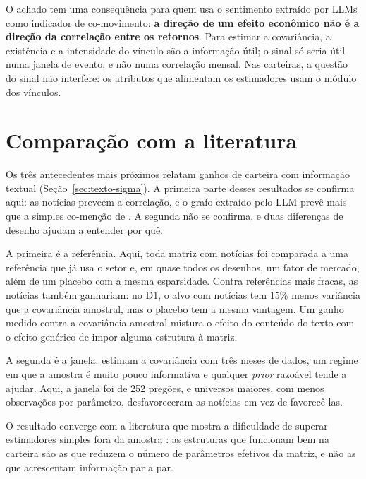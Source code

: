 O achado tem uma consequência para quem usa o sentimento extraído por LLMs como indicador de co-movimento:
\textbf{a direção de um efeito econômico não é a direção da correlação entre os retornos}. Para estimar a
covariância, a existência e a intensidade do vínculo são a informação útil; o sinal só seria útil numa
janela de evento, e não numa correlação mensal. Nas carteiras, a questão do sinal não interfere: os
atributos que alimentam os estimadores usam o módulo dos vínculos.

\section{Comparação com a literatura}
\label{sec:comparacao}

Os três antecedentes mais próximos relatam ganhos de carteira com informação textual
(Seção~\ref{sec:texto-sigma}). A primeira parte desses resultados se confirma aqui: as notícias preveem a
correlação, e o grafo extraído pelo LLM prevê mais que a simples co-menção de \citet{tang2019}. A segunda
não se confirma, e duas diferenças de desenho ajudam a entender por quê.

A primeira é a referência. Aqui, toda matriz com notícias foi comparada a uma referência que já usa o
setor e, em quase todos os desenhos, um fator de mercado, além de um placebo com a mesma esparsidade.
Contra referências mais fracas, as notícias também ganhariam: no D1, o alvo com notícias tem 15\% menos
variância que a covariância amostral, mas o placebo tem a mesma vantagem. Um ganho medido contra a
covariância amostral mistura o efeito do conteúdo do texto com o efeito genérico de impor alguma estrutura
à matriz.

A segunda é a janela. \citet{becquin2023} estimam a covariância com três meses de dados, um regime em que
a amostra é muito pouco informativa e qualquer \emph{prior} razoável tende a ajudar. Aqui, a janela foi
de 252 pregões, e universos maiores, com menos observações por parâmetro, desfavoreceram as notícias em
vez de favorecê-las.

O resultado converge com a literatura que mostra a dificuldade de superar estimadores simples fora da
amostra \citep{demiguel2009}: as estruturas que funcionam bem na carteira são as que reduzem o número de
parâmetros efetivos da matriz, e não as que acrescentam informação par a par.

